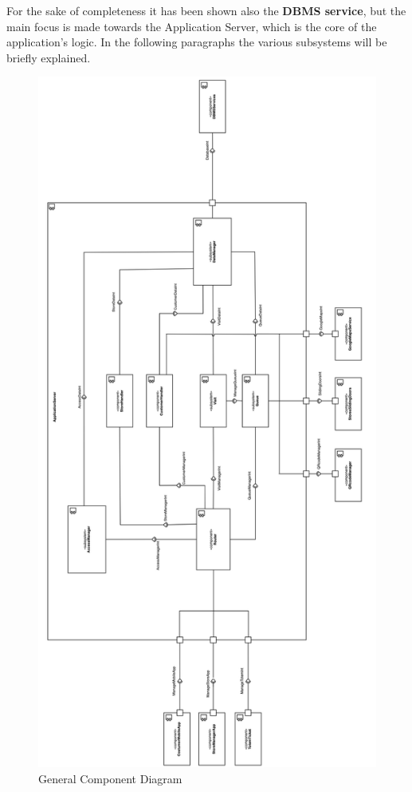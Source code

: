 \documentclass[]{article}
\begin{document}
	\textbf{} \newline
For the sake of completeness it has been shown also the \textbf{DBMS service}, but the main focus is made towards the Application Server, which is the core of the application’s logic. \newline\newline
In the following paragraphs the various subsystems will be briefly explained.\\

	\begin{figure}[H]
			\centering
			\includegraphics[scale=0.6]{ComponentView/ComponentViewDiagram.png}
			\caption{General Component Diagram}
			\label{fig:ComponentDiagram}
		\end{figure}
		\bigskip\bigskip
\end{document}
